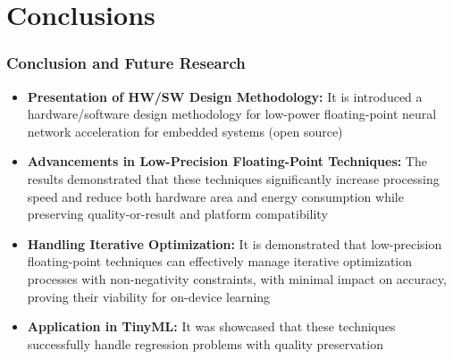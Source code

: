 \section{Conclusions}
\tableofcontents[currentsection]
\begin{frame}[t]
	\frametitle{Conclusion and Future Research}
	
\begin{itemize}
	\item <1-> \textbf{Presentation of HW/SW Design Methodology:} It is introduced a hardware/software design methodology for low-power floating-point neural network acceleration for embedded systems (open source)
	
	\item<2-> \textbf{Advancements in Low-Precision Floating-Point Techniques:} The results demonstrated that these techniques significantly increase processing speed and reduce both hardware area and energy consumption while preserving quality-or-result and platform compatibility
	
	\item<3-> \textbf{Handling Iterative Optimization:} It is demonstrated that low-precision floating-point techniques can effectively manage iterative optimization processes with non-negativity constraints, with minimal impact on accuracy, proving their viability for on-device learning
	
	\item<4-> \textbf{Application in TinyML:} It was showcased that these techniques successfully handle regression problems with quality preservation
\end{itemize}

\end{frame}